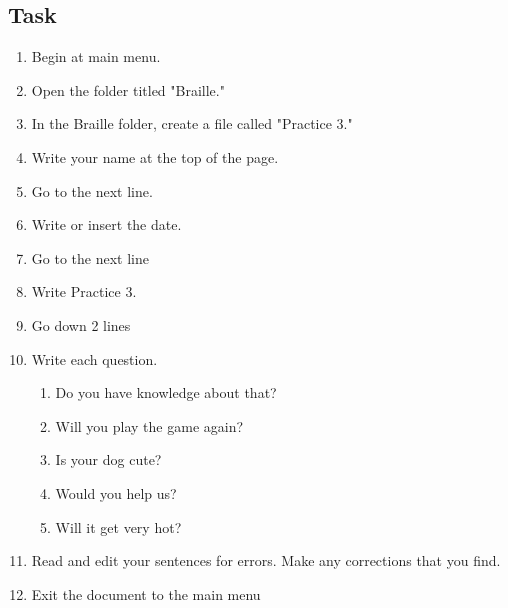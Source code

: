 \documentclass[10pt,letterpaper,twoside]{report}
\begin{document}
{\subsection{Task}
\begin{enumerate}
	\item Begin at main menu.
	\item Open the folder titled "Braille."
	\item In the Braille folder, create a file called "Practice 3."
	\item Write your name at the top of the page.
	\item Go to the next line.
	\item Write or insert the date.
	\item Go to the next line
	\item Write Practice 3.
	\item Go down 2 lines
	\item Write each question.
	      \begin{enumerate}
		      \item Do you have knowledge about that?
		      \item Will you play the game again?
		      \item Is your dog cute?
		      \item Would you help us?
		      \item Will it get very hot?
	      \end{enumerate}
	\item Read and edit your sentences for errors. Make any corrections that you find.
	\item Exit the document to the main menu
\end{enumerate}

\clearpage
}
\end{document}

